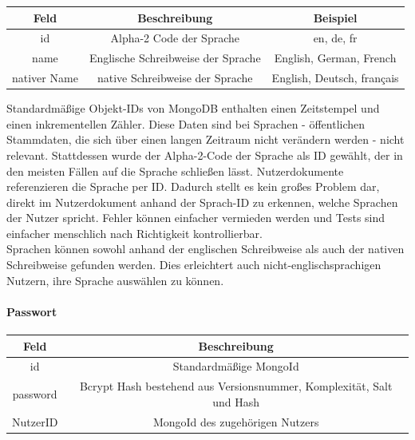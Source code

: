 \begin{center}
    \begin{tabular}{ |c|c|c| }
        \hline
        Feld & Beschreibung & Beispiel \\
        \hline
        id & Alpha-2 Code der Sprache & en, de, fr \\
        name & Englische Schreibweise der Sprache & English, German, French \\
        nativer Name & native Schreibweise der Sprache & English, Deutsch, français \\
        \hline
    \end{tabular}
\end{center}
Standardmäßige Objekt-IDs von MongoDB enthalten einen Zeitstempel und einen inkrementellen Zähler.\cite{MG11} Diese Daten sind bei Sprachen - öffentlichen Stammdaten, die sich über einen langen Zeitraum nicht verändern werden - nicht relevant. Stattdessen wurde der Alpha-2-Code der Sprache als ID gewählt, der in den meisten Fällen auf die Sprache schließen lässt. Nutzerdokumente referenzieren die Sprache per ID. Dadurch stellt es kein großes Problem dar, direkt im Nutzerdokument anhand der Sprach-ID zu erkennen, welche Sprachen der Nutzer spricht. Fehler können einfacher vermieden werden und Tests sind einfacher menschlich nach Richtigkeit kontrollierbar.\\
Sprachen können sowohl anhand der englischen Schreibweise als auch der nativen Schreibweise gefunden werden. Dies erleichtert auch nicht-englischsprachigen Nutzern, ihre Sprache auswählen zu können.

\paragraph{Passwort\\}
\begin{center}
    \begin{tabular}{ |c|c| }
        \hline
        Feld & Beschreibung  \\
        \hline
        id & Standardmäßige MongoId \\
        password & Bcrypt Hash bestehend aus Versionsnummer, Komplexität, Salt und Hash \\
        NutzerID & MongoId des zugehörigen Nutzers \\
        \hline
    \end{tabular}
\end{center}

